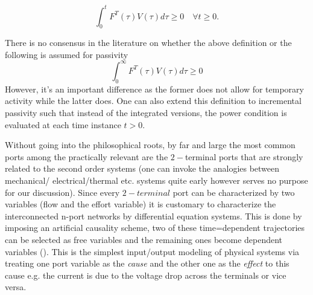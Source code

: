 \[
\int^t_0 F^T(\tau)V(\tau)d\tau \geq 0 \quad \forall t\geq 0.
\]
\begin{rem}There is no consensus in the literature on whether the above definition or the following is assumed for passivity
\[
\int^\infty_0 F^T(\tau)V(\tau)d\tau \geq 0
\]
However, it's an important difference as the former does not allow for temporary activity while the latter does. One can also extend
this definition to incremental passivity such that instead of the integrated versions, the power condition is evaluated at each time 
instance $t>0$.
\end{rem}
Without going into the philosophical roots, by far and large the most common ports among the practically relevant are the 
$2-$terminal ports that are strongly related to the second order systems (one can invoke the analogies between mechanical/%
electrical/thermal etc. systems quite early however serves no purpose for our discussion).  Since every $2-terminal$ port
can be characterized by two variables (flow and the effort variable) it is customary to characterize the interconnected
n-port networks by differential equation systems. This is done by imposing an artificial causality scheme, 
two of these time=dependent trajectories can be selected as free variables and the remaining ones become dependent variables 
(\cite{behavbook}). This is the simplest input/output modeling of physical systems via treating one port variable as the 
\emph{cause} and the other one as the \emph{effect} to this cause e.g. the current is due to the voltage drop across the terminals or 
vice versa. 




